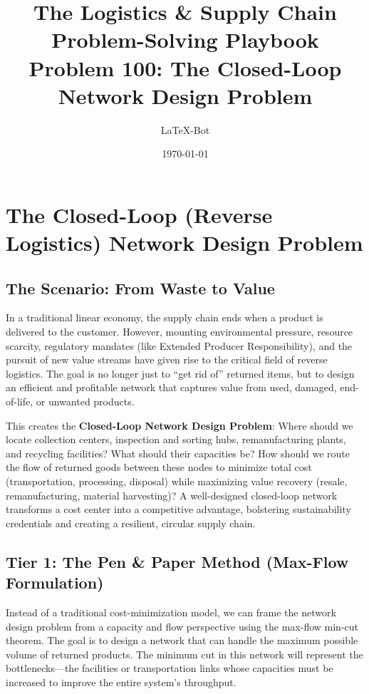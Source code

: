 \documentclass{article}
\title{The Logistics \& Supply Chain Problem-Solving Playbook\\ \large Problem 100: The Closed-Loop Network Design Problem}
\author{LaTeX-Bot}
\date{\today}
\begin{document}
\maketitle

\section{The Closed-Loop (Reverse Logistics) Network Design Problem}

\subsection{The Scenario: From Waste to Value}

In a traditional linear economy, the supply chain ends when a product is delivered to the customer. However, mounting environmental pressure, resource scarcity, regulatory mandates (like Extended Producer Responsibility), and the pursuit of new value streams have given rise to the critical field of reverse logistics. The goal is no longer just to ``get rid of'' returned items, but to design an efficient and profitable network that captures value from used, damaged, end-of-life, or unwanted products.

This creates the \textbf{Closed-Loop Network Design Problem}: Where should we locate collection centers, inspection and sorting hubs, remanufacturing plants, and recycling facilities? What should their capacities be? How should we route the flow of returned goods between these nodes to minimize total cost (transportation, processing, disposal) while maximizing value recovery (resale, remanufacturing, material harvesting)? A well-designed closed-loop network transforms a cost center into a competitive advantage, bolstering sustainability credentials and creating a resilient, circular supply chain.

\subsection{Tier 1: The Pen \& Paper Method (Max-Flow Formulation)}
Instead of a traditional cost-minimization model, we can frame the network design problem from a capacity and flow perspective using the max-flow min-cut theorem. The goal is to design a network that can handle the maximum possible volume of returned products. The minimum cut in this network will represent the bottlenecks—the facilities or transportation links whose capacities must be increased to improve the entire system's throughput.
\end{document}
